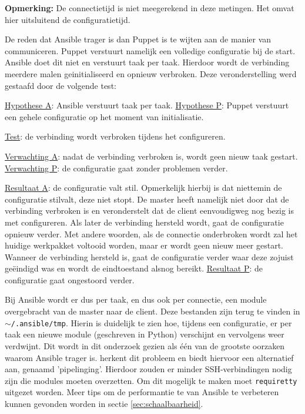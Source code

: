\textbf{Opmerking:} De \gls{connectietijd} is niet meegerekend in deze metingen. Het omvat hier uitsluitend de \gls{configuratietijd}.

De reden dat Ansible trager is dan Puppet is te wijten aan de manier van communiceren. Puppet verstuurt namelijk een volledige configuratie bij de start. Ansible doet dit niet en verstuurt taak per taak. Hierdoor wordt de verbinding meerdere malen geinitialiseerd en opnieuw verbroken. Deze veronderstelling werd gestaafd door de volgende test:

\begin{addmargin}[2em]{0cm}
\underline{Hypothese A}: Ansible verstuurt taak per taak.\newline
\underline{Hypothese P}: Puppet verstuurt een gehele configuratie op het moment van initialisatie.

\underline{Test}: de verbinding wordt verbroken tijdens het configureren.

\underline{Verwachting A}: nadat de verbinding verbroken is, wordt geen nieuw taak gestart.\newline
\underline{Verwachting P}: de configuratie gaat zonder problemen verder.

\underline{Resultaat A}: de configuratie valt stil. Opmerkelijk hierbij is dat niettemin de configuratie stilvalt, deze niet stopt. De master heeft namelijk niet door dat de verbinding verbroken is en veronderstelt dat de client eenvoudigweg nog bezig is met configureren. Als later de verbinding hersteld wordt, gaat de configuratie opnieuw verder. Met andere woorden, als de connectie onderbroken wordt zal het huidige \gls{werkpakket} voltooid worden, maar er wordt geen nieuw meer gestart. Wanneer de verbinding hersteld is, gaat de configuratie verder waar deze zojuist ge\"eindigd was en wordt de eindtoestand alsnog bereikt. \newline
\underline{Resultaat P}: de configuratie gaat ongestoord verder.
\end{addmargin}

Bij Ansible wordt er dus per taak, en dus ook per connectie, een module overgebracht van de master naar de client. Deze bestanden zijn terug te vinden in \texttt{$\sim$/.ansible/tmp}. Hierin is duidelijk te zien hoe, tijdens een configuratie, er per taak een nieuwe module (geschreven in Python) verschijnt en vervolgens weer verdwijnt. Dit wordt in dit onderzoek gezien als \'e\'en van de grootste oorzaken waarom Ansible trager is.  \textcite{AnsibleTuning} herkent dit probleem en biedt hiervoor een alternatief aan, genaamd 'pipelinging'. Hierdoor zouden er minder SSH-verbindingen nodig zijn die modules moeten overzetten. Om dit mogelijk te maken moet \texttt{requiretty} uitgezet worden. Meer tips om de performantie te van Ansible te verbeteren kunnen gevonden worden in sectie \ref{sec:schaalbaarheid}.

